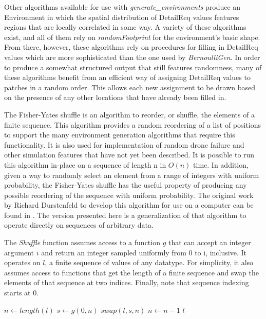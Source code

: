 Other algorithms available for use with \textit{generate\_environments} produce an Environment in which the spatial distribution of DetailReq values features regions that are locally correlated in some way. A variety of these algorithms exist, and all of them rely on \textit{randomFootprint} for the environment's basic shape. From there, however, these algorithms rely on procedures for filling in DetailReq values which are more sophisticated than the one used by \textit{BernoulliGen}. In order to produce a somewhat structured output that still features randomness, many of these algorithms benefit from an efficient way of assigning DetailReq values to patches in a random order. This allows each new assignment to be drawn based on the presence of any other locations that have already been filled in.

The Fisher-Yates shuffle is an algorithm to reorder, or shuffle, the elements of a finite sequence. This algorithm provides a random reordering of a list of positions to support the many environment generation algorithms that require this functionality. It is also used for implementation of random drone failure and other simulation features that have not yet been described. It is possible to run this algorithm in-place on a sequence of length n in $O(n)$ time. In addition, given a way to randomly select an element from a range of integers with uniform probability, the Fisher-Yates shuffle has the useful property of producing any possible reordering of the sequence with uniform probability. The original work by Richard Durstenfeld to develop this algorithm for use on a computer can be found in \cite{FYShuffle}. The version presented here is a generalization of that algorithm to operate directly on sequences of arbitrary data.

The \textit{Shuffle} function assumes access to a function $g$ that can accept an integer argument $i$ and return an integer sampled uniformly from 0 to i, inclusive. It operates on $l$, a finite sequence of values of any datatype. For simplicity, it also assumes access to functions that get the length of a finite sequence and swap the elements of that sequence at two indices. Finally, note that sequence indexing starts at 0.

\begin{algorithmic}

  \State $n\gets length(l)$	
      \State $s\gets g(0, n)$
      \State $swap(l, s, n)$
      \State $n\gets n - 1$
  \EndWhile
  \State \Return $l$
\EndFunction

\end{algorithmic}

